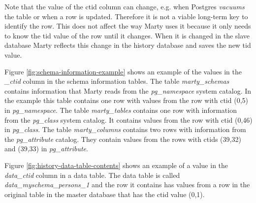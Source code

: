 Note that the value of the ctid column can change, e.g. when Postgres \textit{vacuums} the table or when a row is updated.
Therefore it is not a viable long-term key to identify the row.
This does not affect the way Marty uses it because it only needs to know the tid value of the row until it changes.
When it is changed in the slave database Marty reflects this change in the history database and saves the new tid value.

Figure \ref{fig:schema-information-example} shows an example of the values in the \textit{\_ctid} column in the schema information tables.
The table \textit{marty\_schemas} contains information that Marty reads from the \textit{pg\_namespace} system catalog.
In the example this table contains one row with values from the row with ctid (0,5) in \textit{pg\_namespace}.
The table \textit{marty\_tables} contains one row with information from the \textit{pg\_class} system catalog.
It contains values from the row with ctid (0,46) in \textit{pg\_class}.
The table \textit{marty\_columns} contains two rows with information from the \textit{pg\_attribute} catalog.
They contain values from the rows with ctids (39,32) and (39,33) in \textit{pg\_attribute}.

Figure \ref{fig:history-data-table-contents} shows an example of a value in the \textit{data\_ctid} column in a data table.
The data table is called \textit{data\_myschema\_persons\_1} and the row it contains has values from a row in the original table in the master database that has the ctid value (0,1).